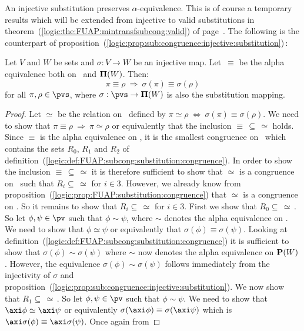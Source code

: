 An injective substitution preserves $\alpha$-equivalence. This is of
course a temporary results which will be extended from injective to
valid substitutions in
theorem~(\ref{logic:the:FUAP:mintransfsubcong:valid}) of
page~\pageref{logic:the:FUAP:mintransfsubcong:valid}. The following
is the counterpart of
proposition~(\ref{logic:prop:sub:congruence:injective:substitution})\,:
\begin{prop}\label{logic:prop:FUAP:charsubcong:injective:substitution}
Let $V$ and $W$ be sets and $\sigma:V\to W$ be an injective map.
Let~$\equiv$ be the alpha equivalence both on \pvs\ and
${\bf\Pi}(W)$. Then:
    \[
    \pi\equiv\rho\ \Rightarrow\ \sigma(\pi)\equiv\sigma(\rho)
    \]
for all $\pi,\rho\in\pvs$, where $\sigma:\pvs\to{\bf\Pi}(W)$ is also
the substitution mapping.
\end{prop}
\begin{proof}
Let $\simeq$ be the relation on \pvs\ defined by $\pi\simeq\rho\
\Leftrightarrow\ \sigma(\pi)\equiv\sigma(\rho)$. We need to show
that $\pi\equiv\rho\ \Rightarrow\ \pi\simeq\rho$ or equivalently
that the inclusion $\equiv\,\subseteq\,\simeq$ holds. Since $\equiv$
is the alpha equivalence on \pvs, it is the smallest
congruence on \pvs\ which contains the sets $R_{0}$, $R_{1}$ and
$R_{2}$ of
definition~(\ref{logic:def:FUAP:subcong:substitution:congruence}).
In order to show the inclusion $\equiv\,\subseteq\,\simeq$ it is
therefore sufficient to show that $\simeq$ is a congruence on \pvs\
such that $R_{i}\subseteq\,\simeq$ for $i\in 3$. However, we already
know from
proposition~(\ref{logic:prop:FUAP:substitution:congruence}) that
$\simeq$ is a congruence on \pvs. So it remains to show that
$R_{i}\subseteq\,\simeq$ for $i\in 3$. First we show that
$R_{0}\subseteq\,\simeq$\,. So let $\phi,\psi\in\pv$ such that
$\phi\sim\psi$, where $\sim$ denotes the alpha equivalence on
\pv. We need to show that $\phi\simeq\psi$ or equivalently that
$\sigma(\phi)\equiv\sigma(\psi)$. Looking at
definition~(\ref{logic:def:FUAP:subcong:substitution:congruence}) it
is sufficient to show that $\sigma(\phi)\sim\sigma(\psi)$ where
$\sim$ now denotes the alpha equivalence on ${\bf P}(W)$.
However, the equivalence $\sigma(\phi)\sim\sigma(\psi)$ follows
immediately from the injectivity of $\sigma$ and
proposition~(\ref{logic:prop:sub:congruence:injective:substitution}).
We now show that $R_{1}\subseteq\,\simeq$\,. So let
$\phi,\psi\in\pv$ such that $\phi\sim\psi$. We need to show that
$\axi\phi\simeq\axi\psi$ or equivalently
$\sigma(\axi\phi)\equiv\sigma(\axi\psi)$ which is
$\axi\sigma(\phi)\equiv\axi\sigma(\psi)$. Once again from

\end{proof}
